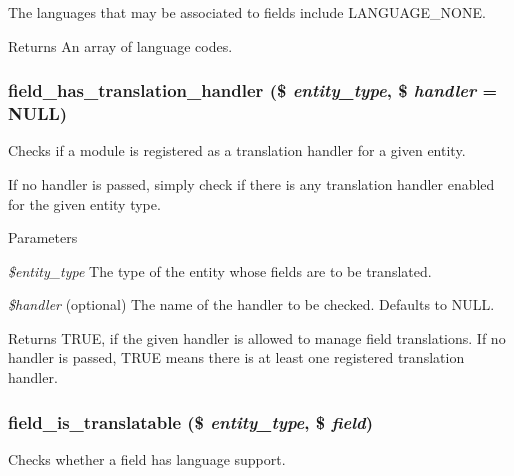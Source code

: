 The languages that may be associated to fields include LANGUAGE\_\-NONE.

\begin{DoxyReturn}{Returns}
An array of language codes. 
\end{DoxyReturn}
\hypertarget{group__field__language_ga56d98c14a956746f91373b68b404a66b}{
\subsubsection[{field\_\-has\_\-translation\_\-handler}]{\setlength{\rightskip}{0pt plus 5cm}field\_\-has\_\-translation\_\-handler (\$ {\em entity\_\-type}, \/  \$ {\em handler} = {\ttfamily NULL})}}
\label{group__field__language_ga56d98c14a956746f91373b68b404a66b}
Checks if a module is registered as a translation handler for a given entity.

If no handler is passed, simply check if there is any translation handler enabled for the given entity type.


\begin{DoxyParams}{Parameters}
\item[{\em \$entity\_\-type}]The type of the entity whose fields are to be translated. \item[{\em \$handler}](optional) The name of the handler to be checked. Defaults to NULL.\end{DoxyParams}
\begin{DoxyReturn}{Returns}
TRUE, if the given handler is allowed to manage field translations. If no handler is passed, TRUE means there is at least one registered translation handler. 
\end{DoxyReturn}
\hypertarget{group__field__language_gae2315cbfa6724de32eeea9e06a1811a7}{
\subsubsection[{field\_\-is\_\-translatable}]{\setlength{\rightskip}{0pt plus 5cm}field\_\-is\_\-translatable (\$ {\em entity\_\-type}, \/  \$ {\em field})}}
\label{group__field__language_gae2315cbfa6724de32eeea9e06a1811a7}
Checks whether a field has language support.

